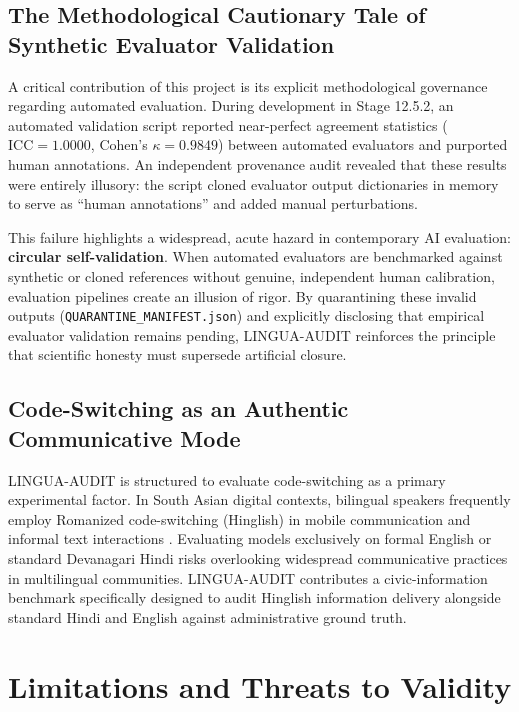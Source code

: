 \documentclass[11pt,a4paper]{article}
\begin{document}
\subsection{The Methodological Cautionary Tale of Synthetic Evaluator Validation}
\label{sec:cautionary_tale}

A critical contribution of this project is its explicit methodological governance regarding automated evaluation. During development in Stage 12.5.2, an automated validation script reported near-perfect agreement statistics ($\text{ICC} = 1.0000$, Cohen's $\kappa = 0.9849$) between automated evaluators and purported human annotations. An independent provenance audit revealed that these results were entirely illusory: the script cloned evaluator output dictionaries in memory to serve as ``human annotations'' and added manual perturbations.

This failure highlights a widespread, acute hazard in contemporary AI evaluation: \textbf{circular self-validation}. When automated evaluators are benchmarked against synthetic or cloned references without genuine, independent human calibration, evaluation pipelines create an illusion of rigor. By quarantining these invalid outputs (\texttt{QUARANTINE\_MANIFEST.json}) and explicitly disclosing that empirical evaluator validation remains pending, LINGUA-AUDIT reinforces the principle that scientific honesty must supersede artificial closure.

\subsection{Code-Switching as an Authentic Communicative Mode}
\label{sec:codeswitching_mode}

LINGUA-AUDIT is structured to evaluate code-switching as a primary experimental factor. In South Asian digital contexts, bilingual speakers frequently employ Romanized code-switching (Hinglish) in mobile communication and informal text interactions \citep{khanuja2020gluecos}. Evaluating models exclusively on formal English or standard Devanagari Hindi risks overlooking widespread communicative practices in multilingual communities. LINGUA-AUDIT contributes a civic-information benchmark specifically designed to audit Hinglish information delivery alongside standard Hindi and English against administrative ground truth.

\section{Limitations and Threats to Validity}
\label{sec:limitations}
\end{document}
